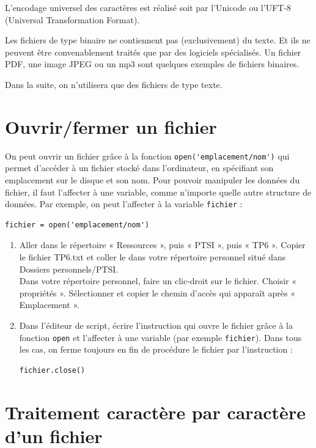 L’encodage universel des caractères est réalisé soit par l’Unicode ou l’UFT-8 (Universal Transformation Format).

Les fichiers de type binaire ne contiennent pas (exclusivement) du texte. Et ils ne peuvent être convenablement traités que par des logiciels spécialisés. Un fichier PDF, une image JPEG ou un mp3 sont quelques exemples de fichiers binaires.

Dans la suite, on n’utilisera que des fichiers de type texte.

\section*{Ouvrir/fermer un fichier}

On peut ouvrir un fichier grâce à la fonction \verb|open('emplacement/nom')| qui permet d'accéder à un fichier stocké dans l'ordinateur, en spécifiant son emplacement sur le disque et son nom. Pour pouvoir manipuler les données du fichier, il faut l'affecter à une variable, comme n'importe quelle autre structure de données. Par exemple, on peut l'affecter à la variable \verb|fichier| :

\begin{verbatim}
fichier = open('emplacement/nom') 
\end{verbatim}

\begin{enumerate}
\item Aller dans le répertoire « Ressources », puis « PTSI », puis « TP6 ». Copier le fichier {\og}TP6.txt{\fg} et coller le dans votre répertoire personnel situé dans {\og}Dossiers personnels/PTSI{\fg}.\\
Dans votre répertoire personnel, faire un clic-droit sur le fichier. Choisir « propriétés ». Sélectionner et copier le chemin d'accès qui apparaît après « Emplacement ».

\item Dans l'éditeur de script, écrire l'instruction qui ouvre le fichier grâce à la fonction \verb|open| et l'affecter à une variable (par exemple \verb|fichier|). Dans tous les cas, on ferme toujours en fin de procédure le fichier par l'instruction :
\begin{verbatim}
fichier.close() 
\end{verbatim}

\end{enumerate}

\section*{Traitement caractère par caractère d'un fichier}

